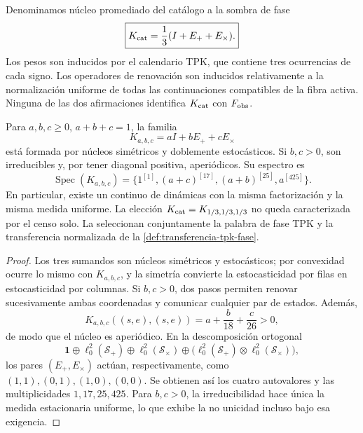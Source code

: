 \begin{definition}
\label{def:nucleo-tritico-refresco}
Denominamos núcleo promediado del catálogo a la sombra de fase
\[
 \boxed{
 K_{\rm cat}=\frac13(I+E_++E_\times).
 }
\]
Los pesos son inducidos por el calendario TPK, que contiene tres ocurrencias
de cada signo. Los operadores de renovación son inducidos relativamente a la
normalización uniforme de todas las continuaciones compatibles de la fibra
activa. Ninguna de las dos afirmaciones identifica \(K_{\rm cat}\) con
\(F_{\rm obs}\).
\end{definition}

\begin{proposition}
\label{prop:familia-refrescos-abc}
Para \(a,b,c\geq0\), \(a+b+c=1\), la familia
\[
 K_{a,b,c}=aI+bE_++cE_\times
\]
está formada por núcleos simétricos y doblemente estocásticos. Si \(b,c>0\),
son irreducibles y, por tener diagonal positiva, aperiódicos. Su espectro es
\[
 \operatorname{Spec}(K_{a,b,c})=
 \{1^{[1]},(a+c)^{[17]},(a+b)^{[25]},a^{[425]}\}.
\]
En particular, existe un continuo de dinámicas con la misma factorización y la
misma medida uniforme. La elección
\(K_{\rm cat}=K_{1/3,1/3,1/3}\) no queda caracterizada por el censo solo. La
seleccionan conjuntamente la palabra de fase TPK y la transferencia
normalizada de la \cref{def:transferencia-tpk-fase}.
\end{proposition}

\begin{proof}
Los tres sumandos son núcleos simétricos y estocásticos; por convexidad ocurre
lo mismo con \(K_{a,b,c}\), y la simetría convierte la estocasticidad por filas
en estocasticidad por columnas. Si \(b,c>0\), dos pasos permiten renovar
sucesivamente ambas coordenadas y comunicar cualquier par de estados. Además,
\[
 K_{a,b,c}((s,e),(s,e))=a+\frac b{18}+\frac c{26}>0,
\]
de modo que el núcleo es aperiódico. En la descomposición ortogonal
\[
 \mathbf1\oplus\ell_0^2(\mathcal S_+)
 \oplus\ell_0^2(\mathcal S_\times)
 \oplus\bigl(\ell_0^2(\mathcal S_+)\otimes
              \ell_0^2(\mathcal S_\times)\bigr),
\]
los pares \((E_+,E_\times)\) actúan, respectivamente, como
\((1,1),(0,1),(1,0),(0,0)\). Se obtienen así los cuatro autovalores y las
multiplicidades \(1,17,25,425\). Para \(b,c>0\), la irreducibilidad hace única
la medida estacionaria uniforme, lo que exhibe la no unicidad incluso bajo
esa exigencia.
\end{proof}

